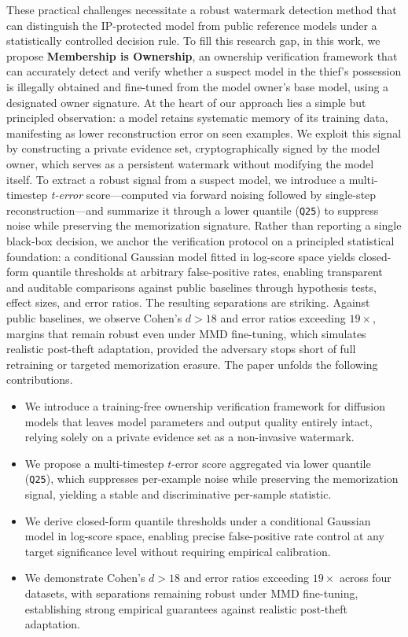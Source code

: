 \documentclass[sigconf, review, anonymous]{acmart}
\begin{document}
These practical challenges necessitate a robust watermark detection method that can distinguish the IP-protected model from public reference models under a statistically controlled decision rule.
To fill this research gap, in this work, we propose \textbf{Membership is Ownership}, an ownership verification framework that can accurately detect and verify whether a suspect model in the thief's possession is illegally obtained and fine-tuned from the model owner's base model, using a designated owner signature.
At the heart of our approach lies a simple but principled observation: a model retains systematic memory of its training data, manifesting as lower reconstruction error on seen examples. We exploit this signal by constructing a private evidence set, cryptographically signed by the model owner, which serves as a persistent watermark without modifying the model itself.
To extract a robust signal from a suspect model, we introduce a multi-timestep \emph{t-error} score—computed via forward noising followed by single-step reconstruction—and summarize it through a lower quantile (\texttt{Q25}) to suppress noise while preserving the memorization signature. Rather than reporting a single black-box decision, we anchor the verification protocol on a principled statistical foundation: a conditional Gaussian model fitted in log-score space yields closed-form quantile thresholds at arbitrary false-positive rates, enabling transparent and auditable comparisons against public baselines through hypothesis tests, effect sizes, and error ratios.
The resulting separations are striking. Against public baselines, we observe Cohen's $d > 18$ and error ratios exceeding $19\times$, margins that remain robust even under MMD fine-tuning, which simulates realistic post-theft adaptation, provided the adversary stops short of full retraining or targeted memorization erasure.
The paper unfolds the following contributions.
\begin{itemize}
    \item We introduce a training-free ownership verification framework
    for diffusion models that leaves model parameters and output
    quality entirely intact, relying solely on a private evidence
    set as a non-invasive watermark.

    \item We propose a multi-timestep $t$-error score aggregated via
    lower quantile (\texttt{Q25}), which suppresses per-example noise
    while preserving the memorization signal, yielding a stable and
    discriminative per-sample statistic.

    \item We derive closed-form quantile thresholds under a conditional
    Gaussian model in log-score space, enabling precise false-positive
    rate control at any target significance level without requiring
    empirical calibration.

    \item We demonstrate Cohen's $d > 18$ and error ratios exceeding
    $19\times$ across four datasets, with separations remaining robust
    under MMD fine-tuning, establishing strong empirical guarantees
    against realistic post-theft adaptation.
\end{itemize}
\end{document}
